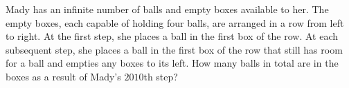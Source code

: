 Mady has an infinite number of balls and empty boxes available to her. The empty boxes, each capable of holding four balls, are arranged in a row from left to right. At the first step, she places a ball in the first box of the row. At each subsequent step, she places a ball in the first box of the row that still has room for a ball and empties any boxes to its left. How many balls in total are in the boxes as a result of Mady's $2010$th step?

